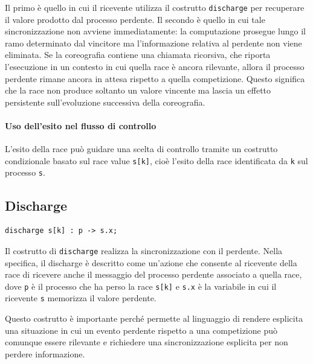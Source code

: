 Il primo è quello in cui il ricevente utilizza il costrutto \texttt{discharge} per recuperare il valore prodotto dal processo perdente. Il secondo è quello in cui tale sincronizzazione non avviene immediatamente: la computazione prosegue lungo il ramo determinato dal vincitore ma l’informazione relativa al perdente non viene eliminata. Se la coreografia contiene una chiamata ricorsiva, che riporta l’esecuzione in un contesto in cui quella race è ancora rilevante, allora il processo perdente rimane ancora in attesa rispetto a quella competizione. Questo significa che la race non produce soltanto un valore vincente ma lascia un effetto persistente sull’evoluzione successiva della coreografia.

\paragraph{Uso dell’esito nel flusso di controllo}

L’esito della race può guidare una scelta di controllo tramite un costrutto condizionale basato sul race value \texttt{s[k]}, cioè l’esito della race identificata da \texttt{k} sul processo \texttt{s}.

\subsection*{Discharge}

\begin{tcolorbox}[
colback=white,
colframe=black!35,
boxrule=0.4pt,
arc=1mm,
left=1.5mm,right=1.5mm,top=0.8mm,bottom=0.8mm
]
\begin{lstlisting}
discharge s[k] : p -> s.x;
\end{lstlisting}
\end{tcolorbox}

Il costrutto di \texttt{discharge} realizza la sincronizzazione con il perdente. Nella specifica, il discharge è descritto come un’azione che consente al ricevente della race di ricevere anche il messaggio del processo perdente associato a quella race, dove \texttt{p} è il processo che ha perso la race \texttt{s[k]} e \texttt{s.x} è la variabile in cui il ricevente \texttt{s} memorizza il valore perdente.

Questo costrutto è importante perché permette al linguaggio di rendere esplicita una situazione in cui un evento perdente rispetto a una competizione può comunque essere rilevante e richiedere una sincronizzazione esplicita per non perdere informazione.

